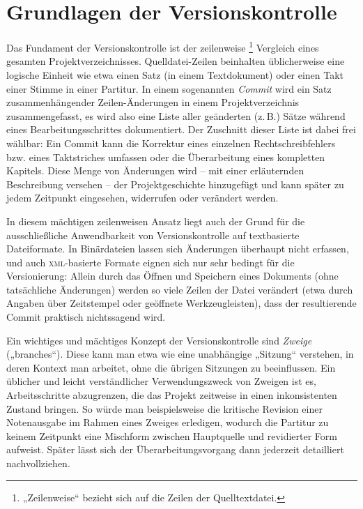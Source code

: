 \documentclass[DIV=12]{scrreprt}
\begin{document}
\section{Grundlagen der Versionskontrolle}
\label{sec:pt_basics-version-control}
Das Fundament der Versionskontrolle ist der zeilenweise%
\footnote{„Zeilenweise“ bezieht sich auf die Zeilen der Quelltextdatei.}
Vergleich eines gesamten Projektverzeichnisses.
Quelldatei-Zeilen beinhalten üblicherweise eine logische Einheit wie etwa einen Satz (in einem Textdokument) oder einen Takt einer Stimme in einer Partitur.
In einem sogenannten \emph{Commit} wird ein Satz zusammenhängender Zeilen-Änderungen in 
einem Projektverzeichnis zusammengefasst, es wird also eine Liste aller geänderten (z.\,B.) Sätze während eines Bearbeitungsschrittes dokumentiert.
Der Zuschnitt dieser Liste ist dabei frei wählbar:
Ein Commit kann die Korrektur eines einzelnen Rechtschreibfehlers bzw. eines Taktstriches umfassen oder die Überarbeitung eines kompletten Kapitels.
Diese Menge von Änderungen wird -- mit einer erläuternden Beschreibung versehen -- der Projektgeschichte hinzugefügt und kann später zu jedem Zeitpunkt eingesehen, widerrufen oder verändert werden.

In diesem mächtigen zeilenweisen Ansatz liegt auch der Grund für die ausschließliche Anwendbarkeit von Versionskontrolle auf textbasierte Dateiformate.
In Binärdateien lassen sich Änderungen überhaupt nicht erfassen, und auch \textsc{xml}-basierte Formate eignen sich nur sehr bedingt für die Versionierung:
Allein durch das Öffnen und Speichern eines Dokuments (ohne tatsächliche Änderungen) werden so viele Zeilen der Datei verändert (etwa durch Angaben über Zeitstempel oder geöffnete Werkzeugleisten), dass der resultierende Commit praktisch nichtssagend wird.

Ein wichtiges und mächtiges Konzept der Versionskontrolle sind \emph{Zweige} („branches“).
Diese kann man etwa wie eine unabhängige „Sitzung“ verstehen, in deren Kontext man arbeitet, ohne die übrigen Sitzungen zu beeinflussen.
Ein üblicher und leicht verständlicher Verwendungszweck von Zweigen ist es, 
Arbeitsschritte abzugrenzen, die das Projekt zeitweise in einen inkonsistenten Zustand bringen.
So würde man beispielsweise die kritische Revision einer Notenausgabe im Rahmen eines Zweiges erledigen, wodurch die Partitur zu keinem Zeitpunkt eine Mischform zwischen Hauptquelle und revidierter Form aufweist.
Später lässt sich der Überarbeitungsvorgang dann jederzeit detailliert nachvollziehen.
\end{document}
